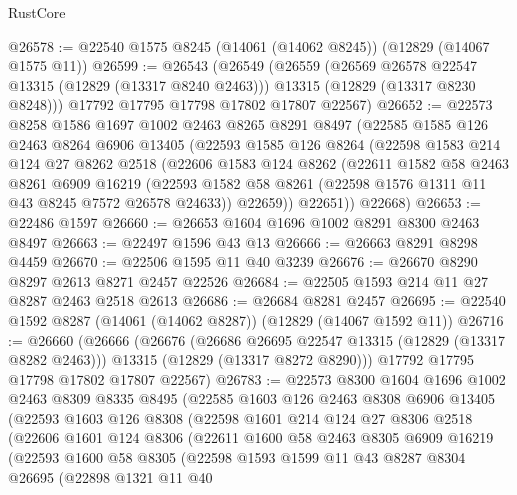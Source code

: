 \begin{lexlean}{RustCore}
\begin{coremodule}
@26578 := @22540 @1575 @8245 (@14061 (@14062 @8245)) (@12829 (@14067 @1575 @11))
@26599 := @26543
    (@26549
      (@26559
        (@26569 @26578 @22547 @13315 (@12829 (@13317 @8240 @2463)))
        @13315
        (@12829 (@13317 @8230 @8248)))
      @17792
      @17795
      @17798
      @17802
      @17807
      @22567)
@26652 := @22573
    @8258
    @1586
    @1697
    @1002
    @2463
    @8265
    @8291
    @8497
    (@22585
      @1585
      @126
      @2463
      @8264
      @6906
      @13405
      (@22593
        @1585
        @126
        @8264
        (@22598
          @1583
          @214
          @124
          @27
          @8262
          @2518
          (@22606
            @1583
            @124
            @8262
            (@22611
              @1582
              @58
              @2463
              @8261
              @6909
              @16219
              (@22593 @1582 @58 @8261 (@22598 @1576 @1311 @11 @43 @8245 @7572 @26578 @24633))
              @22659))
          @22651))
      @22668)
@26653 := @22486 @1597
@26660 := @26653 @1604 @1696 @1002 @8291 @8300 @2463 @8497
@26663 := @22497 @1596 @43 @13
@26666 := @26663 @8291 @8298 @4459
@26670 := @22506 @1595 @11 @40 @3239
@26676 := @26670 @8290 @8297 @2613 @8271 @2457 @22526
@26684 := @22505 @1593 @214 @11 @27 @8287 @2463 @2518 @2613
@26686 := @26684 @8281 @2457
@26695 := @22540 @1592 @8287 (@14061 (@14062 @8287)) (@12829 (@14067 @1592 @11))
@26716 := @26660
    (@26666
      (@26676
        (@26686 @26695 @22547 @13315 (@12829 (@13317 @8282 @2463)))
        @13315
        (@12829 (@13317 @8272 @8290)))
      @17792
      @17795
      @17798
      @17802
      @17807
      @22567)
@26783 := @22573
    @8300
    @1604
    @1696
    @1002
    @2463
    @8309
    @8335
    @8495
    (@22585
      @1603
      @126
      @2463
      @8308
      @6906
      @13405
      (@22593
        @1603
        @126
        @8308
        (@22598
          @1601
          @214
          @124
          @27
          @8306
          @2518
          (@22606
            @1601
            @124
            @8306
            (@22611
              @1600
              @58
              @2463
              @8305
              @6909
              @16219
              (@22593
                @1600
                @58
                @8305
                (@22598
                  @1593
                  @1599
                  @11
                  @43
                  @8287
                  @8304
                  @26695
                  (@22898
                    @1321
                    @11
                    @40

\end{coremodule}
\end{lexlean}
